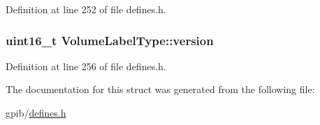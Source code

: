 Definition at line 252 of file defines.\+h.

\subsubsection[{\texorpdfstring{version}{version}}]{\setlength{\rightskip}{0pt plus 5cm}uint16\+\_\+t Volume\+Label\+Type\+::version}\hypertarget{structVolumeLabelType_a59f56fd1f28549bc625aeaaa57c8d0d2}{}\label{structVolumeLabelType_a59f56fd1f28549bc625aeaaa57c8d0d2}


Definition at line 256 of file defines.\+h.



The documentation for this struct was generated from the following file\+:\begin{DoxyCompactItemize}
\item 
gpib/\hyperlink{defines_8h}{defines.\+h}\end{DoxyCompactItemize}
